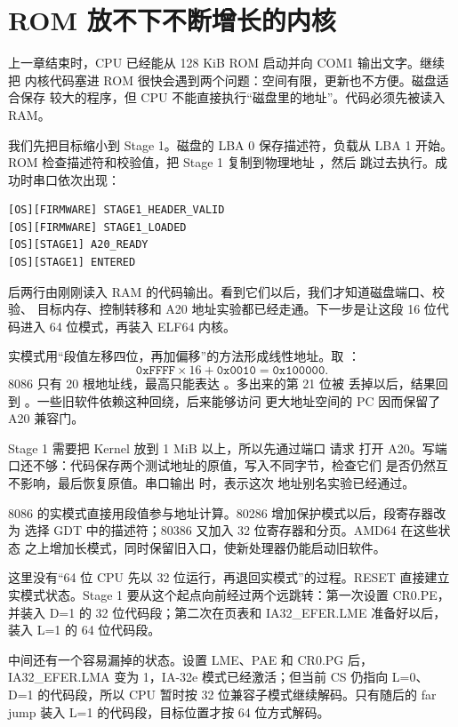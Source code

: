 \section{ROM 放不下不断增长的内核}

上一章结束时，CPU 已经能从 128 KiB ROM 启动并向 COM1 输出文字。继续把
内核代码塞进 ROM 很快会遇到两个问题：空间有限，更新也不方便。磁盘适合保存
较大的程序，但 CPU 不能直接执行“磁盘里的地址”。代码必须先被读入 RAM。

我们先把目标缩小到 Stage 1。磁盘的 LBA 0 保存描述符，负载从 LBA 1 开始。
ROM 检查描述符和校验值，把 Stage 1 复制到物理地址 ，然后
跳过去执行。成功时串口依次出现：

\begin{lstlisting}
[OS][FIRMWARE] STAGE1_HEADER_VALID
[OS][FIRMWARE] STAGE1_LOADED
[OS][STAGE1] A20_READY
[OS][STAGE1] ENTERED
\end{lstlisting}

后两行由刚刚读入 RAM 的代码输出。看到它们以后，我们才知道磁盘端口、校验、
目标内存、控制转移和 A20 地址实验都已经走通。下一步是让这段 16 位代码进入
64 位模式，再装入 ELF64 内核。

实模式用“段值左移四位，再加偏移”的方法形成线性地址。取
：
\[
  \mathtt{0xFFFF}\times16+\mathtt{0x0010}
  =\mathtt{0x100000}.
\]
8086 只有 20 根地址线，最高只能表达 。多出来的第 21 位被
丢掉以后，结果回到 。一些旧软件依赖这种回绕，后来能够访问
更大地址空间的 PC 因而保留了 A20 兼容门。

Stage 1 需要把 Kernel 放到 1 MiB 以上，所以先通过端口  请求
打开 A20。写端口还不够：代码保存两个测试地址的原值，写入不同字节，检查它们
是否仍然互不影响，最后恢复原值。串口输出  时，表示这次
地址别名实验已经通过。

8086 的实模式直接用段值参与地址计算。80286 增加保护模式以后，段寄存器改为
选择 GDT 中的描述符；80386 又加入 32 位寄存器和分页。AMD64 在这些状态
之上增加长模式，同时保留旧入口，使新处理器仍能启动旧软件。

这里没有“64 位 CPU 先以 32 位运行，再退回实模式”的过程。RESET 直接建立
实模式状态。Stage 1 要从这个起点向前经过两个远跳转：第一次设置
CR0.PE，并装入 D=1 的 32 位代码段；第二次在页表和 IA32\_EFER.LME
准备好以后，装入 L=1 的 64 位代码段。

中间还有一个容易漏掉的状态。设置 LME、PAE 和 CR0.PG 后，
IA32\_EFER.LMA 变为 1，IA-32e 模式已经激活；但当前 CS 仍指向 L=0、
D=1 的代码段，所以 CPU 暂时按 32 位兼容子模式继续解码。只有随后的 far
jump 装入 L=1 的代码段，目标位置才按 64 位方式解码。

